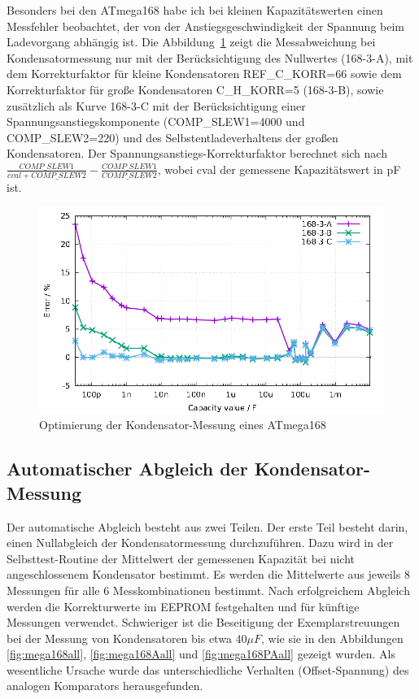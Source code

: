 Besonders bei den ATmega168 habe ich bei kleinen Kapazitätswerten einen Messfehler beobachtet, 
der von der Anstiegsgeschwindigkeit der Spannung beim Ladevorgang abhängig ist.
Die Abbildung~\ref{fig:mega168optcap} zeigt die Messabweichung bei Kondensatormessung nur mit der Berücksichtigung des
Nullwertes (168-3-A), mit dem Korrekturfaktor für kleine Kondensatoren REF\_C\_KORR=66 sowie dem Korrekturfaktor für große
Kondensatoren C\_H\_KORR=5 (168-3-B), sowie zusätzlich als Kurve 168-3-C  mit der Berücksichtigung einer Span\-nungs\-an\-stiegs\-kom\-po\-nen\-te 
(COMP\_SLEW1=4000 und COMP\_SLEW2=220) und des Selbst\-ent\-lade\-ver\-hal\-tens der großen Kon\-den\-sa\-toren.
Der Span\-nungs\-an\-stiegs-Kor\-rek\-tur\-faktor berechnet sich nach \(\frac{COMP\_SLEW1}{cval+COMP\_SLEW2} - \frac{COMP\_SLEW1}{COMP\_SLEW2}\),
wobei cval der gemessene Kapazitätswert in pF ist.

\begin{figure}[H]
\centering
\includegraphics[width=16cm]{../GNU/Mega168cap_opt.pdf}
\caption{Optimierung der Kondensator-Messung eines ATmega168}
\label{fig:mega168optcap}
\end{figure}

\subsection{Automatischer Abgleich der Kondensator-Messung}

Der automatische Abgleich besteht aus zwei Teilen. Der erste Teil besteht darin, einen Nullabgleich der Kondensatormessung durchzuführen.
Dazu wird in der Selbsttest-Routine der Mittelwert der gemessenen Kapazität bei nicht angeschlossenem Kondensator bestimmt.
Es werden die Mittelwerte aus jeweils 8 Messungen für alle 6 Messkombinationen bestimmt.
Nach erfolgreichem Abgleich werden die Korrekturwerte im EEPROM festgehalten und für künftige Messungen verwendet.
Schwieriger ist die Beseitigung der Exemplarstreuungen bei der Messung von Kondensatoren bis etwa \(40\mu F\), wie sie in den 
Abbildungen \ref{fig:mega168all}, \ref{fig:mega168Aall} und \ref{fig:mega168PAall} gezeigt wurden.
Als wesentliche Ursache wurde das unterschiedliche Verhalten (Offset-Spannung) des analogen Komparators herausgefunden.

